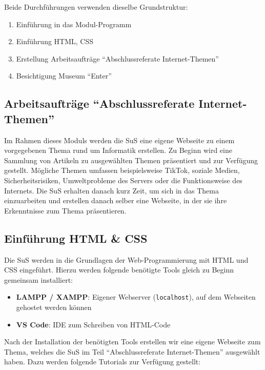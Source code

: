 Beide Durchführungen verwenden dieselbe Grundstruktur:
\begin{enumerate}
	\item Einführung in das Modul-Programm
	\item Einführung HTML, CSS
	\item Erstellung Arbeitsaufträge \enquote{Abschlussreferate Internet-Themen}
	\item Besichtigung Museum \enquote{Enter}
\end{enumerate}

\subsection{Arbeitsaufträge \enquote{Abschlussreferate Internet-Themen}}
Im Rahmen dieses Moduls werden die SuS eine eigene Webseite zu einem vorgegebenen Thema rund um Informatik erstellen. Zu Beginn wird eine Sammlung von Artikeln zu ausgewählten Themen präsentiert und zur Verfügung gestellt. Mögliche Themen umfassen beispielsweise TikTok, soziale Medien, Sicherheitsrisiken, Umweltprobleme des Servers oder die Funktionsweise des Internets. Die SuS erhalten danach kurz Zeit, um sich in das Thema einzuarbeiten und erstellen danach selber eine Webseite, in der sie ihre Erkenntnisse zum Thema präsentieren.

\subsection{Einführung HTML \& CSS}
Die SuS werden in die Grundlagen der Web-Programmierung mit HTML und CSS eingeführt. Hierzu werden folgende benötigte Tools gleich zu Beginn gemeinsam installiert:
\begin{itemize}
	\item \textbf{LAMPP / XAMPP}: Eigener Webserver (\texttt{localhost}), auf dem Webseiten gehostet werden können
	\item \textbf{VS Code}: IDE zum Schreiben von HTML-Code
\end{itemize}

Nach der Installation der benötigten Tools erstellen wir eine eigene Webseite zum Thema, welches die SuS im Teil \enquote{Abschlussreferate Internet-Themen} ausgewählt haben. Dazu werden folgende Tutorials zur Verfügung gestellt:

